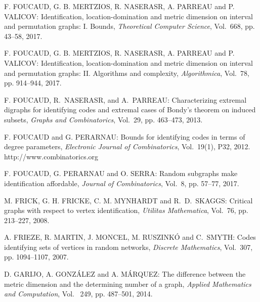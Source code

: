 \begin{thebibliography}{999}
F. FOUCAUD, G. B. MERTZIOS, R. NASERASR, A. PARREAU and P. VALICOV: Identification, location-domination and metric dimension on interval and permutation graphs: I. Bounds, {\it Theoretical Computer Science}, Vol.~668, pp. 43--58, 2017.

F. FOUCAUD, G. B. MERTZIOS, R. NASERASR, A. PARREAU and P. VALICOV: Identification, location-domination and metric dimension on interval and permutation graphs: II. Algorithms and complexity, {\it Algorithmica}, Vol.~78, pp. 914--944, 2017.

F. FOUCAUD, R.~NASERASR, and A.~PARREAU: Characterizing extremal digraphs for identifying codes and extremal cases of Bondy's theorem on induced subsets, {\it Graphs and Combinatorics}, Vol.~29, pp. 463--473, 2013.

F. FOUCAUD and G. PERARNAU: Bounds for identifying codes in terms of degree parameters, {\it Electronic Journal of Combinatorics}, Vol.~19(1), P32, 2012.\\
http://www.combinatorics.org

F. FOUCAUD, G. PERARNAU and O. SERRA: Random subgraphs make identification affordable, {\it Journal of  Combinatorics}, Vol.~8, pp. 57--77, 2017.

%
%
M. FRICK, G. H. FRICKE, C. M. MYNHARDT and R.~D.~SKAGGS: Critical graphs with respect to vertex identification, {\it Utilitas Mathematica}, Vol.~76, pp. 213--227, 2008.

A. FRIEZE, R. MARTIN, J. MONCEL, M. RUSZINK\'O and C.~SMYTH: Codes identifying sets of vertices in random networks, {\it Discrete Mathematics}, Vol.~307, pp. 1094--1107, 2007.

%
D. GARIJO, A. GONZ\'ALEZ and A. M\'ARQUEZ: The difference between the metric dimension and the determining number of a graph, {\it Applied Mathematics and Computation}, Vol.~ 249, pp. 487--501, 2014.
  

\end{thebibliography}
